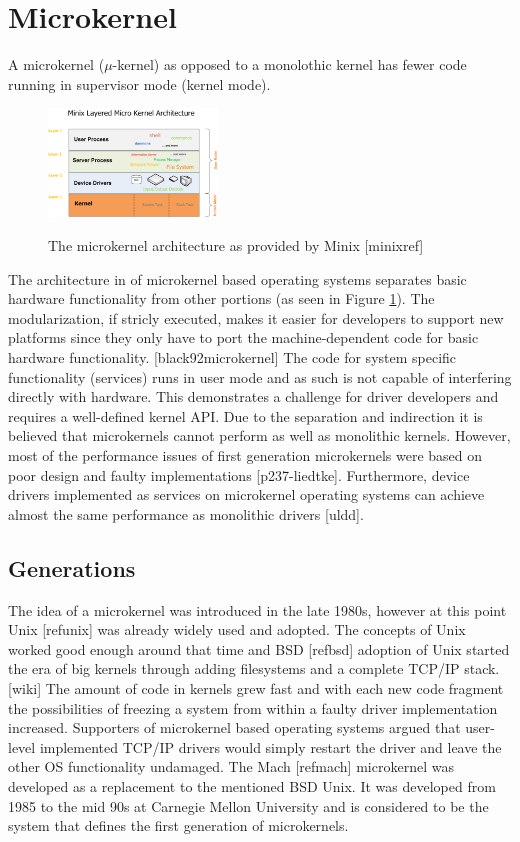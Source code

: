\documentclass{acm_proc_article-sp}
\begin{document}
\section{Microkernel}
\label{sec:microkernel}
A microkernel ($\mu$-kernel) as opposed to a monolothic kernel has fewer code running in
supervisor mode (kernel mode).
\begin{figure}
\centering
\includegraphics[width=0.4\textwidth]{minixinternalstructure.png}
\label{fig:minixmicarch}
\caption{The microkernel architecture as provided by Minix [minixref]}
\end{figure}
The architecture in of microkernel based operating systems separates basic
hardware functionality from other portions (as seen in Figure \ref{fig:minixmicarch}).
The modularization, if stricly executed, makes it easier for developers to support new
platforms since they only have to port the machine-dependent code for basic hardware functionality.
[black92microkernel]
The code for system specific functionality (services) runs in user mode and as such
is not capable of interfering directly with hardware.
This demonstrates a challenge for driver developers and requires a well-defined kernel API.
Due to the separation and indirection it is believed that microkernels cannot perform as well as
monolithic kernels.
However, most of the performance issues of first generation microkernels were based on poor design
and faulty implementations [p237-liedtke].
Furthermore, device drivers implemented as services on microkernel operating systems can achieve
almost the same performance as monolithic drivers [uldd].

\subsection{Generations}
The idea of a microkernel was introduced in the late 1980s, however at this point Unix [refunix]
was already widely used and adopted.
The concepts of Unix worked good enough around that time and BSD [refbsd] adoption of Unix started
the era of big kernels through adding filesystems and a complete TCP/IP stack. [wiki]
The amount of code in kernels grew fast and with each new code fragment the possibilities of
freezing a system from within a faulty driver implementation increased.
Supporters of microkernel based operating systems argued that user-level implemented TCP/IP drivers
would simply restart the driver and leave the other OS functionality undamaged.
The Mach [refmach] microkernel was developed as a replacement to the mentioned BSD Unix.
It was developed from 1985 to the mid 90s at Carnegie Mellon University and is considered to be
the system that defines the first generation of microkernels.
\end{document}
